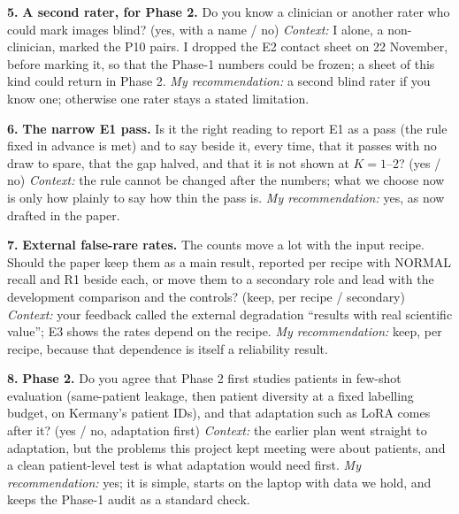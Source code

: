 \documentclass[10pt,a4paper]{article}
\newcommand{\ask}[2]{\par\smallskip\noindent\textcolor{accent}{\textbf{#1.}} #2\par}
\begin{document}
\ask{5}{\textbf{A second rater, for Phase 2.} Do you know a clinician or another rater who could mark images
blind? (yes, with a name / no) \emph{Context:} I alone, a non-clinician, marked the P10 pairs. I dropped the E2
contact sheet on 22 November, before marking it, so that the Phase-1 numbers could be frozen; a sheet of this
kind could return in Phase 2. \emph{My recommendation:} a second blind rater if you know one; otherwise one
rater stays a stated limitation.}

\ask{6}{\textbf{The narrow E1 pass.} Is it the right reading to report E1 as a pass (the rule fixed in advance is
met) and to say beside it, every time, that it passes with no draw to spare, that the gap halved, and that it is not
shown at $K=1$--2? (yes / no) \emph{Context:} the rule cannot be changed after the numbers; what we choose now is
only how plainly to say how thin the pass is. \emph{My recommendation:} yes, as now drafted in the paper.}

\ask{7}{\textbf{External false-rare rates.} The counts move a lot with the input recipe. Should the paper keep them
as a main result, reported per recipe with NORMAL recall and R1 beside each, or move them to a secondary role and
lead with the development comparison and the controls? (keep, per recipe / secondary) \emph{Context:} your
feedback called the external degradation ``results with real scientific value''; E3 shows the rates depend on
the recipe. \emph{My recommendation:} keep, per recipe, because that dependence is itself a reliability result.}

\ask{8}{\textbf{Phase 2.} Do you agree that Phase 2 first studies patients in few-shot evaluation (same-patient
leakage, then patient diversity at a fixed labelling budget, on Kermany's patient IDs), and that adaptation such as
LoRA comes after it? (yes / no, adaptation first) \emph{Context:} the earlier plan went straight to adaptation, but
the problems this project kept meeting were about patients, and a clean patient-level test is what adaptation
would need first. \emph{My recommendation:} yes; it is simple, starts on the laptop with data we hold, and keeps
the Phase-1 audit as a standard check.}
\end{document}
